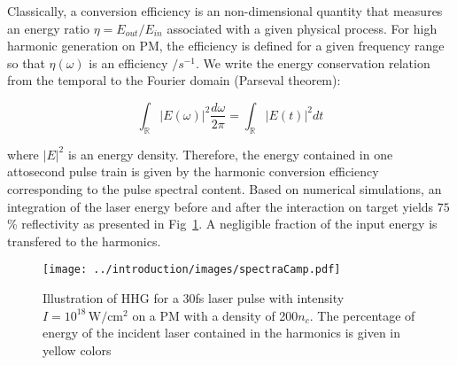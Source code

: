


%

\noindent Classically, a conversion efficiency is an non-dimensional quantity that measures an energy ratio $\eta = E_{out}/E_{in}$ associated with a given physical process. For high harmonic generation on PM, the efficiency is defined for a given frequency range so that $\eta (\omega)$ is an efficiency $/s^{-1}$. We write the energy conservation relation from the temporal to the Fourier domain (Parseval theorem): 

$$
\int_{\mathbb{R}}|E(\omega)|^2\frac{d\omega}{2\pi} = \int_{\mathbb{R}}|E(t)|^2 dt
$$

\noindent where $|E|^2$ is an energy density. Therefore, the energy contained in one attosecond pulse train is given by the harmonic conversion efficiency corresponding to the pulse spectral content. Based on numerical simulations, an integration of the laser energy before and after the interaction on target yields $75$\% reflectivity as presented in Fig~\ref{fig:spectraCamp}. A negligible fraction of the input energy is transfered to the harmonics. 

\begin{figure}[H]
\texttt{[image: ../introduction/images/spectraCamp.pdf]}\\
\caption{\label{fig:spectraCamp} Illustration of HHG for a 30fs laser pulse with intensity $ I = 10^{18}\,\mathrm{W/cm^2}$ on a PM with a density of 200$n_c$. The percentage of energy of the incident laser contained in the harmonics is given in yellow colors}
\end{figure}

